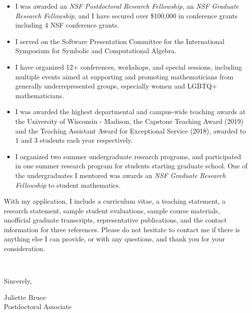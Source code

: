 \documentclass[11pt]{article}
\begin{document}
\begin{itemize}[leftmargin=*]
\item I was awarded an \textit{NSF Postdoctoral Research Fellowship}, an \textit{NSF Graduate Research Fellowship}, and I have secured over \$100,000 in conference grants including 4 NSF conference grants. 
\item  I served on the Software Presentation Committee for the International Symposium for Symbolic and Computational Algebra.
\item I have organized 12+ conferences, workshops, and special sessions, including multiple events aimed at supporting and promoting mathematicians from generally underrepresented groups, especially women and LGBTQ+ mathematicians. 
\item I was awarded the highest departmental and campus-wide teaching awards at the University of Wisconsin - Madison, the Capstone Teaching Award (2019) and the Teaching Assistant Award for Exceptional Service (2018), awarded to 1 and 3 students each year respectively. 
\item I organized two summer undergraduate research programs, and participated in one summer research program for students starting graduate school. One of the undergraduates I mentored was awards an \textit{NSF Graduate Research Fellowship} to student mathematics.  
\end{itemize}

With my application, I include a curriculum vitae, a teaching statement, a research statement, sample student evaluations, sample course materials, unofficial graduate transcripts, representative publications, and the contact information for three references. Please do not hesitate to contact me if there is anything else I can provide, or with any questions, and thank you for your consideration. 

\vspace{24pt}
\noindent
\begin{minipage}{0.99\textwidth}
\begin{minipage}{0.69\textwidth}
\textcolor{white}{.}
\end{minipage}
\begin{minipage}{0.29\textwidth}
Sincerely, 

\vspace{20pt}
Juliette Bruce\\
Postdoctoral Associate\end{minipage}
\end{minipage}

\end{document}
